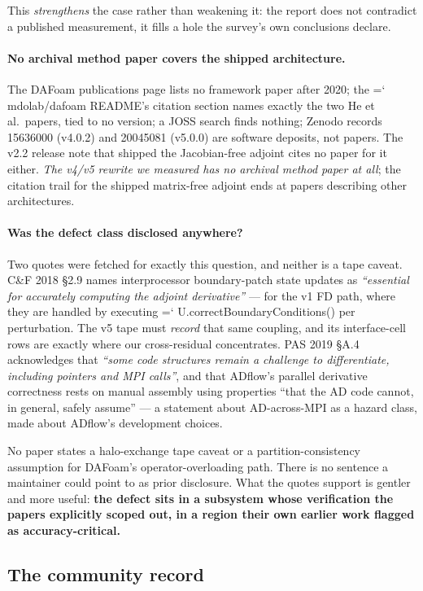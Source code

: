 \documentclass[11pt,a4paper]{article}
\newcommand{\artifact}[1]{{\small\ttfamily\hyphenchar\font=`\-\relax
  \def\_{\textunderscore\allowbreak}#1}}
\begin{document}
This \emph{strengthens} the case rather than weakening it: the report does not contradict a
published measurement, it fills a hole the survey's own conclusions declare.

\paragraph{No archival method paper covers the shipped architecture.} The DAFoam
publications page lists no framework paper after 2020; the \artifact{mdolab/dafoam} README's
citation section names exactly the two He et al.\ papers, tied to no version; a JOSS search
finds nothing; Zenodo records 15636000 (v4.0.2) and 20045081 (v5.0.0) are software deposits,
not papers. The v2.2 release note that shipped the Jacobian-free adjoint cites no paper for
it either. \emph{The v4/v5 rewrite we measured has no archival method paper at all}; the
citation trail for the shipped matrix-free adjoint ends at papers describing other
architectures.

\paragraph{Was the defect class disclosed anywhere?} Two quotes were fetched for exactly this
question, and neither is a tape caveat. C\&F 2018 \S2.9 names interprocessor boundary-patch
state updates as \emph{``essential for accurately computing the adjoint derivative''} --- for
the v1 FD path, where they are handled by executing
\artifact{U.correctBoundaryConditions()} per perturbation. The v5 tape must \emph{record}
that same coupling, and its interface-cell rows are exactly where our cross-residual
concentrates. PAS 2019 \S A.4 acknowledges that \emph{``some code structures remain a
challenge to differentiate, including pointers and MPI calls''}, and that ADflow's parallel
derivative correctness rests on manual assembly using properties ``that the AD code cannot,
in general, safely assume'' --- a statement about AD-across-MPI as a hazard class, made about
ADflow's development choices.

No paper states a halo-exchange tape caveat or a partition-consistency assumption for
DAFoam's operator-overloading path. There is no sentence a maintainer could point to as prior
disclosure. What the quotes support is gentler and more useful: \textbf{the defect sits in a
subsystem whose verification the papers explicitly scoped out, in a region their own earlier
work flagged as accuracy-critical.}

\subsection{The community record}
\end{document}
